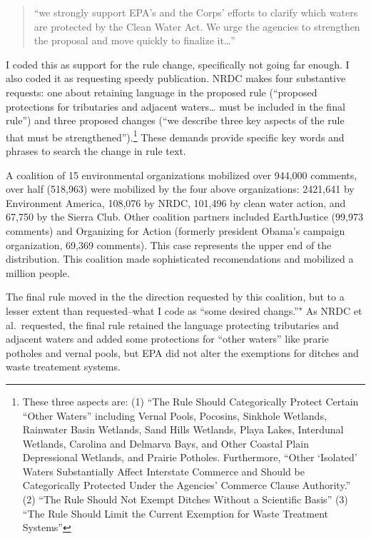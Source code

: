 \documentclass[
      12pt,
        ]{article}
\begin{document}
\begin{quote}
``we strongly support EPA's and the Corps' efforts to clarify which waters are protected by the Clean Water Act. We urge the agencies to strengthen the proposal and move quickly to finalize it\ldots{}''
\end{quote}

I coded this as support for the rule change, specifically not going far enough. I also coded it as requesting speedy publication. NRDC makes four substantive requests: one about retaining language in the proposed rule (``proposed protections for tributaries and adjacent waters\ldots{} must be included in the final rule'') and three proposed changes (``we describe three key aspects of the rule that must be strengthened'').\footnote{These three aspects are: (1) ``The Rule Should Categorically Protect Certain ``Other Waters'' including Vernal Pools, Pocosins, Sinkhole Wetlands, Rainwater Basin Wetlands, Sand Hills Wetlands, Playa Lakes, Interdunal Wetlands, Carolina and Delmarva Bays, and Other Coastal Plain Depressional Wetlands, and Prairie Potholes. Furthermore, ``Other `Isolated' Waters Substantially Affect Interstate Commerce and Should be Categorically Protected Under the Agencies' Commerce Clause Authority.'' (2) ``The Rule Should Not Exempt Ditches Without a Scientific Basis'' (3) ``The Rule Should Limit the Current Exemption for Waste Treatment Systems''} These demands provide specific key words and phrases to search the change in rule text.

A coalition of 15 environmental organizations mobilized over 944,000 comments, over half (518,963) were mobilized by the four above organizations: 2421,641 by Environment America, 108,076 by NRDC, 101,496 by clean water action, and 67,750 by the Sierra Club. Other coalition partners included EarthJustice (99,973 comments) and Organizing for Action (formerly president Obama's campaign organization, 69,369 comments). This case represents the upper end of the distribution. This coalition made sophisticated recomendations and mobilized a million people.

The final rule moved in the the direction requested by this coalition, but to a lesser extent than requested--what I code as ``some desired changs.''" As NRDC et al.~requested, the final rule retained the language protecting tributaries and adjacent waters and added some protections for ``other waters'' like prarie potholes and vernal pools, but EPA did not alter the exemptions for ditches and waste treatement systems.
\end{document}
